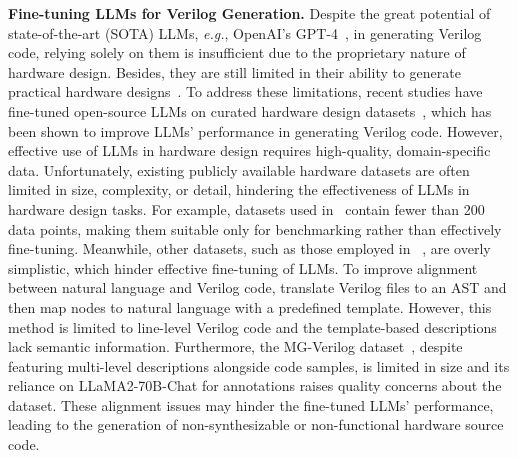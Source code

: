\textbf{Fine-tuning LLMs for Verilog Generation.} 
Despite the great potential of state-of-the-art (SOTA) LLMs, \textit{e.g.}, OpenAI's GPT-4~\citep{achiam2023gpt}, in generating Verilog code, relying solely on them is insufficient due to the proprietary nature of hardware design. Besides, they are still limited in their ability to generate practical hardware designs~\citep{fu2023gpt4aigchip}.
To address these limitations, recent studies have fine-tuned open-source LLMs on curated hardware design datasets~\citep{liu2023verilogeval,chang2024data,thakur2024verigen,zhang2024mg}, which has been shown to improve LLMs' performance in generating Verilog code. 
However, effective use of LLMs in hardware design requires high-quality, domain-specific data.
Unfortunately, existing publicly available hardware datasets are often limited in size, complexity, or detail, hindering the effectiveness of LLMs in hardware design tasks.
For example, datasets used in~\citet{thakur2023benchmarking,lu2024rtllm} contain fewer than 200 data points, making them suitable only for benchmarking rather than effectively fine-tuning.
Meanwhile, other datasets, such as those employed in ~\citet{liu2023verilogeval,thakur2024verigen}, 
are overly simplistic, which hinder effective fine-tuning of LLMs.
To improve alignment between natural language and Verilog code, \citet{chang2024data} translate Verilog files to an AST and then map nodes to natural language with a predefined template.
However, this method is limited to line-level Verilog code and the template-based descriptions lack semantic information. 
Furthermore, the MG-Verilog dataset~\citep{zhang2024mg}, despite featuring multi-level descriptions alongside code samples, is limited in size and its reliance on LLaMA2-70B-Chat for annotations raises quality concerns about the dataset.
These alignment issues may hinder the fine-tuned LLMs' performance, leading to the generation of non-synthesizable or non-functional hardware source code.
